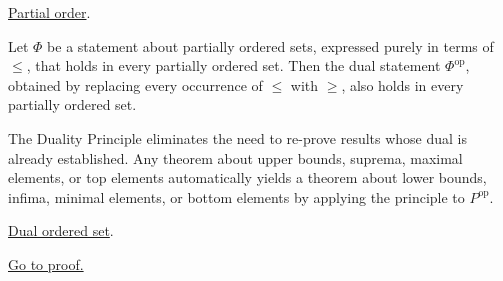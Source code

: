 \begin{remark*}[Dependencies]
\hyperref[def:partial-order]{Partial order}.
\end{remark*}


\begin{proposition}
\label{prop:duality-principle}
Let $\Phi$ be a statement about partially ordered sets, expressed purely
in terms of $\leq$, that holds in every partially ordered set.  Then the
dual statement $\Phi^{\mathrm{op}}$, obtained by replacing every
occurrence of $\leq$ with $\geq$, also holds in every partially ordered
set.
\end{proposition}

\begin{remark*}[Interpretation]
The Duality Principle eliminates the need to re-prove results whose dual
is already established.  Any theorem about upper bounds, suprema, maximal
elements, or top elements automatically yields a theorem about lower
bounds, infima, minimal elements, or bottom elements by applying the
principle to $P^{\mathrm{op}}$.
\end{remark*}

\begin{remark*}[Dependencies]
\hyperref[def:dual-ordered-set]{Dual ordered set}.
\end{remark*}

\begin{remark*}[Proof]
\hyperref[prf:duality-principle]{Go to proof.}
\end{remark*}

